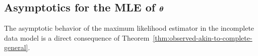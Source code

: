 \documentclass[bj]{imsart}
\numberwithin{equation}{section}
\theoremstyle{plain}
\newtheorem{proposition}[thm]{Proposition}
\theoremstyle{remark}
\begin{document}
% 
% 









\subsection{Asymptotics for the MLE of $\boldsymbol{\theta}$}

The asymptotic behavior of the maximum likelihood estimator in the incomplete data model is a direct consequence of Theorem~\ref{thm:observed-akin-to-complete-general}.
\end{document}
